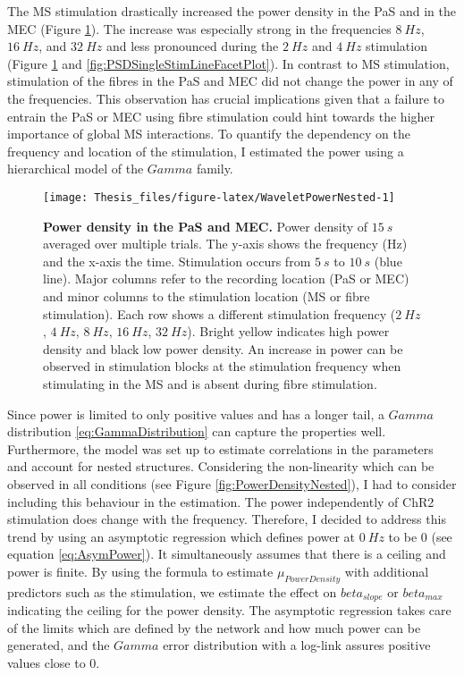 \documentclass[
  12pt,
  a4paper,
  openany]{book}
\begin{document}
The MS stimulation drastically increased the power density in the PaS and in the MEC (Figure \ref{fig:WaveletPowerNested}). The increase was especially strong in the frequencies \(8\ Hz\), \(16\ Hz\), and \(32\ Hz\) and less pronounced during the \(2\ Hz\) and \(4\ Hz\) stimulation (Figure \ref{fig:WaveletPowerNested} and \ref{fig:PSDSingleStimLineFacetPlot}). In contrast to MS stimulation, stimulation of the fibres in the PaS and MEC did not change the power in any of the frequencies. This observation has crucial implications given that a failure to entrain the PaS or MEC using fibre stimulation could hint towards the higher importance of global MS interactions. To quantify the dependency on the frequency and location of the stimulation, I estimated the power using a hierarchical model of the \(Gamma\) family.




\begin{figure}[htb]

{\centering \texttt{[image: Thesis\_files/figure-latex/WaveletPowerNested-1]} 

}

\caption[Power density in the PaS and MEC]{\textbf{Power density in the PaS and MEC.} Power density of \(15\ s\) averaged over multiple trials. The y-axis shows the frequency (Hz) and the x-axis the time. Stimulation occurs from \(5\ s\) to \(10\ s\) (blue line). Major columns refer to the recording location (PaS or MEC) and minor columns to the stimulation location (MS or fibre stimulation). Each row shows a different stimulation frequency (\(2\ Hz\), \(4\ Hz\), \(8\ Hz\), \(16\ Hz\), \(32\ Hz\)). Bright yellow indicates high power density and black low power density. An increase in power can be observed in stimulation blocks at the stimulation frequency when stimulating in the MS and is absent during fibre stimulation.}\label{fig:WaveletPowerNested}
\end{figure}

Since power is limited to only positive values and has a longer tail, a \(Gamma\) distribution \eqref{eq:GammaDistribution} can capture the properties well. Furthermore, the model was set up to estimate correlations in the parameters and account for nested structures. Considering the non-linearity which can be observed in all conditions (see Figure \ref{fig:PowerDensityNested}), I had to consider including this behaviour in the estimation. The power independently of ChR2 stimulation does change with the frequency. Therefore, I decided to address this trend by using an asymptotic regression which defines power at \(0\ Hz\) to be \(0\) (see equation \eqref{eq:AsymPower}). It simultaneously assumes that there is a ceiling and power is finite. By using the formula to estimate \(\mu_{PowerDensity}\) with additional predictors such as the stimulation, we estimate the effect on \(beta_{slope}\) or \(beta_{max}\) indicating the ceiling for the power density. The asymptotic regression takes care of the limits which are defined by the network and how much power can be generated, and the \(Gamma\) error distribution with a log-link assures positive values close to \(0\).
\end{document}
